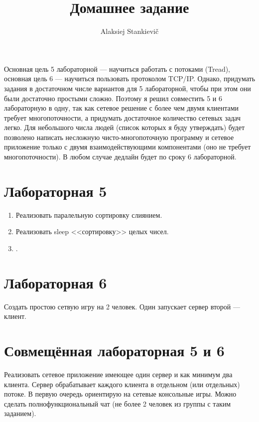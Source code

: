 \documentclass[12pt]{article}
\author{Alaksiej Stankievič}
\title{Домашнее задание}
\begin{document}

Основная цель 5 лабораторной --- научиться работать с потоками (Tread), 
основная цель 6 --- научиться пользовать протоколом TCP/IP. Однако,  придумать 
задания в достаточном числе вариантов для 5 лабораторной, чтобы при этом они 
были достаточно простыми сложно. Поэтому я решил совместить 5 и 6 лабораторную 
в одну, так как сетевое решение с более чем двумя клиентами требует 
многопоточности, а придумать достаточное количество сетевых задач легко. Для 
небольшого числа людей (список которых я буду утверждать) будет позволено 
написать несложную чисто-многопоточную программу и сетевое приложение только с 
двумя взаимодействующими компонентами (оно не требует многопоточности). В любом 
случае дедлайн будет по сроку 6 лабораторной.

\section*{Лабораторная 5}



\begin{enumerate}
	\item Реализовать паралельную сортировку слиянием.
	\item Реализовать sleep <<сортировку>> целых чисел.
	\item .
\end{enumerate}

\section*{Лабораторная 6}

Создать простою сетвую игру на 2 человек. Один запускает сервер второй --- 
клиент.

\section*{Совмещённая лабораторная 5 и 6}

Реализовать сетевое приложение имеющее один сервер и как минимум два клиента. 
Сервер обрабатывает каждого клиента в отдельном (или отдельных) потоке. В 
первую очередь ориентирую на сетевые консольные игры. Можно сделать 
полнофункциональный чат (не более 2 человек из группы с таким заданием).
\end{document}
